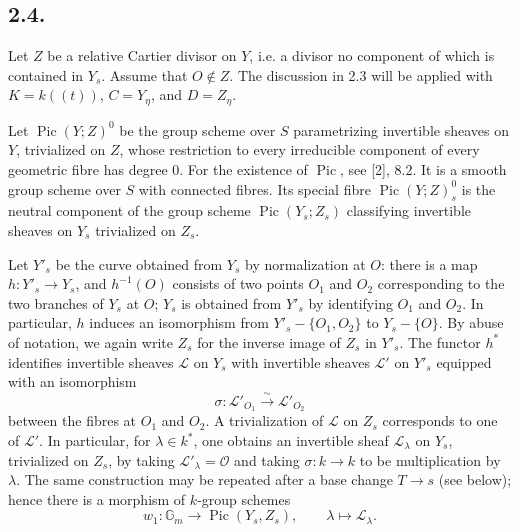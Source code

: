 \documentclass[11pt,leqno]{article}
\DeclareMathOperator{\Pic}{Pic}
\newcommand{\OO}{\mathcal O}
\newcommand{\GG}{\mathbb G}
\begin{document}
\subsection*{2.4.}
Let $Z$ be a relative Cartier divisor on $Y$, i.e. a divisor no component of which is contained in $Y_s$. Assume that $O\notin Z$. The discussion in 2.3 will be applied with $K=k((t))$, $C=Y_\eta$, and $D=Z_\eta$.

Let $\Pic(Y;Z)^0$ be the group scheme over $S$ parametrizing invertible sheaves on $Y$, trivialized on $Z$, whose restriction to every irreducible component of every geometric fibre has degree 0. For the existence of $\Pic$, see [2], 8.2. It is a smooth group scheme over $S$ with connected fibres. Its special fibre $\Pic(Y;Z)^0_s$ is the neutral component of the group scheme $\Pic(Y_s;Z_s)$ classifying invertible sheaves on $Y_s$ trivialized on $Z_s$.

Let $Y'_s$ be the curve obtained from $Y_s$ by normalization at $O$: there is a map $h:Y'_s\to Y_s$, and $h^{-1}(O)$ consists of two points $O_1$ and $O_2$ corresponding to the two branches of $Y_s$ at $O$; $Y_s$ is obtained from $Y'_s$ by identifying $O_1$ and $O_2$. In particular, $h$ induces an isomorphism from $Y'_s-\{O_1,O_2\}$ to $Y_s-\{O\}$. By abuse of notation, we again write $Z_s$ for the inverse image of $Z_s$ in $Y'_s$. The functor $h^*$ identifies invertible sheaves $\mathscr L$ on $Y_s$ with invertible sheaves $\mathscr L'$ on $Y'_s$ equipped with an isomorphism
\[
        \sigma:\mathscr L'_{O_1}\xrightarrow{\sim}\mathscr L'_{O_2}
\]
between the fibres at $O_1$ and $O_2$. A trivialization of $\mathscr L$ on $Z_s$ corresponds to one of $\mathscr L'$. In particular, for $\lambda\in k^*$, one obtains an invertible sheaf $\mathscr L_\lambda$ on $Y_s$, trivialized on $Z_s$, by taking $\mathscr L'_\lambda=\OO$ and taking $\sigma:k\to k$ to be multiplication by $\lambda$. The same construction may be repeated after a base change $T\to s$ (see below); hence there is a morphism of $k$-group schemes
\begin{equation}
        w_1:\GG_m\longrightarrow\Pic(Y_s,Z_s),\qquad \lambda\longmapsto\mathscr L_\lambda. \tag{2.4.1}
\end{equation}
\end{document}
